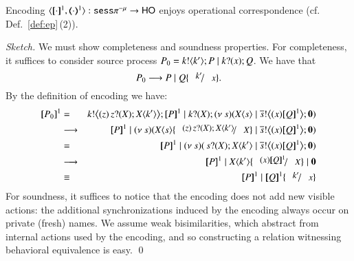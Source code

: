 \begin{proposition}
Encoding $\encod{\cdot}{\cdot}{1}: \sespnr \to \HO$  enjoys operational correspondence (cf. Def.~\ref{def:ep}\,(2)).
\end{proposition}

\begin{proof}[Sketch]
We must show completeness and soundness properties. 
For completeness, it suffices to consider source process $P_0 = k ! \langle k' \rangle ; P \;|\; k ? (x) ; Q$. We have that
\[
P_0 \red P \Par Q\subst{k'}{x}.
\]
By the definition of encoding we have:
\begin{eqnarray*}
\pmap{P_0}{1} & = & \bbout{k}{ \abs{z}{\,\binp{z}{X} \appl{X}{k'}} } \pmap{P}{1} \Par \binp{k}{X} \newsp{s}{\appl{X}{s} \Par \bbout{\dual{s}}{\abs{x} \pmap{Q}{1}} \inact}  \\
& \red & \pmap{P}{1} \Par \newsp{s}{\appl{X}{s} \subst{\abs{z}{\,\binp{z}{X} \appl{X}{k'}}}{X} \Par \bbout{\dual{s}}{\abs{x} \pmap{Q}{1}} \inact} \\
& = & \pmap{P}{1} \Par \newsp{s}{\,\binp{s}{X} \appl{X}{k'} \Par \bbout{\dual{s}}{\abs{x} \pmap{Q}{1}} \inact} \\
& \red & \pmap{P}{1} \Par \appl{X}{k'} \subst{\abs{x} \pmap{Q}{1}}{X} \Par \inact \\
& \scong & \pmap{P}{1} \Par \pmap{Q}{1}\subst{k'}{x}  
\end{eqnarray*}
For soundness, it suffices to notice that the encoding does not add new visible actions: the additional synchronizations induced by the encoding always occur on private (fresh) names. We assume weak bisimilarities, which abstract from internal actions used by the encoding, and so  constructing a relation witnessing behavioral equivalence is easy.
\qed
\end{proof}

